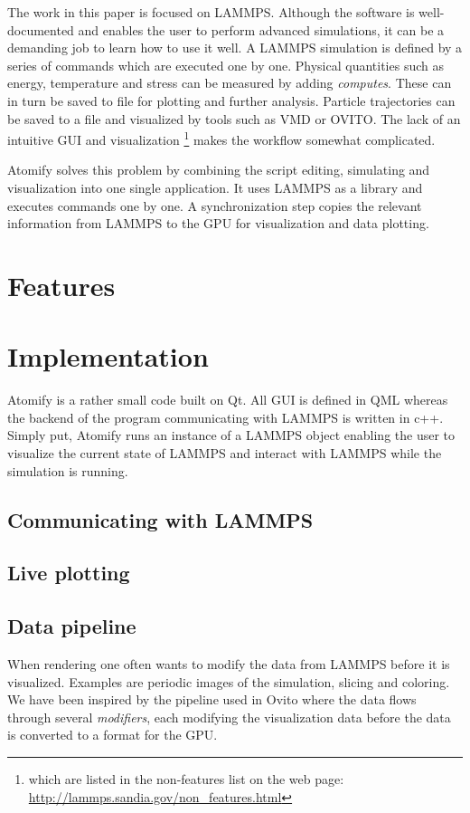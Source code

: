 \documentclass[aps,pre,twocolumn,letterpaper,floatfix]{revtex4}
\begin{document}
The work in this paper is focused on LAMMPS. Although the software is well-documented and enables the user to perform advanced simulations, it can be a demanding job to learn how to use it well. A LAMMPS simulation is defined by a series of commands which are executed one by one. Physical quantities such as energy, temperature and stress can be measured by adding \textit{computes}. These can in turn be saved to file for plotting and further analysis. Particle trajectories can be saved to a file and visualized by tools such as VMD\cite{Humphrey1996Vmd} or OVITO\cite{Stukowski2009Visualization}. The lack of an intuitive GUI and visualization \footnote{which are listed in the non-features list on the web page: \url{http://lammps.sandia.gov/non_features.html}} makes the workflow somewhat complicated. 

Atomify solves this problem by combining the script editing, simulating and visualization into one single application. It uses LAMMPS as a library and executes commands one by one. A synchronization step copies the relevant information from LAMMPS to the GPU for visualization and data plotting. 


\section{Features}


\section{Implementation}
Atomify is a rather small code built on Qt. All GUI is defined in QML whereas the backend of the program communicating with LAMMPS is written in c++. Simply put, Atomify runs an instance of a LAMMPS object enabling the user to visualize the current state of LAMMPS and interact with LAMMPS while the simulation is running. 

\subsection{Communicating with LAMMPS}

\subsection{Live plotting}

\subsection{Data pipeline}
When rendering one often wants to modify the data from LAMMPS before it is visualized. Examples are periodic images of the simulation, slicing and coloring. We have been inspired by the pipeline used in Ovito where the data flows through several \textit{modifiers}, each modifying the visualization data before the data is converted to a format for the GPU.
\end{document}
